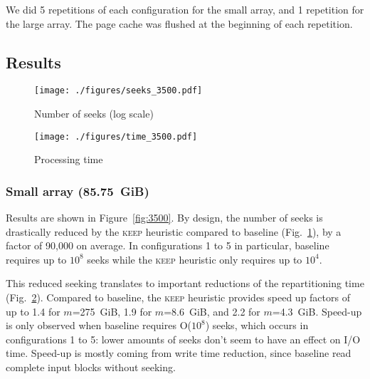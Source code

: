 \documentclass[sigconf, nonacm]{acmart}
\newcommand{\keep}[0]{\textsc{keep}\xspace}
\begin{document}
We did 5 repetitions of each configuration for the small array, and 1
repetition for the large array. The page cache was flushed at the beginning
of each repetition.


\subsection{Results}

\begin{figure*}
  \centering
  \begin{subfigure}{\textwidth}
    \caption{Number of seeks (log scale)}
    \texttt{[image: ./figures/seeks\_3500.pdf]}
    \label{fig:seeks_3500}
  \end{subfigure}
  \begin{subfigure}{\textwidth}
    \caption{Processing time}
   \texttt{[image: ./figures/time\_3500.pdf]}
  \label{fig:time_3500}
  \end{subfigure}
  \caption{Repartitioning results for the small array (85.75~GiB). Averages on 5 repetitions. \textbf{(a)} Compared to baseline, the \keep heuristic
  reduces the number of seeks by four orders of magnitude. \textbf{(b)} The \keep heuristic provides speed-up factors of up to 2.5 (configuration 4).}
  \label{fig:3500}
\end{figure*}


\subsubsection{Small array (85.75~GiB)}

Results are shown in Figure~\ref{fig:3500}.
By design, the number of seeks is drastically reduced by the \keep
heuristic compared to baseline (Fig.~\ref{fig:seeks_3500}), by a factor of
90,000 on average. In configurations 1 to 5 in particular, baseline
requires up to $10^8$ seeks while the \keep heuristic only requires up to
$10^4$.

This reduced seeking translates to important reductions of the
repartitioning time (Fig.~\ref{fig:time_3500}). Compared to baseline, the
\keep heuristic provides speed up factors of up to 1.4 for
$m$=275~GiB, 1.9 for $m$=8.6~GiB, and 2.2 for $m$=4.3~GiB.
Speed-up is only observed when baseline requires O($10^8$) seeks, which occurs
in configurations 1 to 5: lower amounts of seeks don't seem to have an effect on
I/O time. Speed-up is mostly coming from write time reduction, since
baseline read complete input blocks without seeking.
\end{document}
